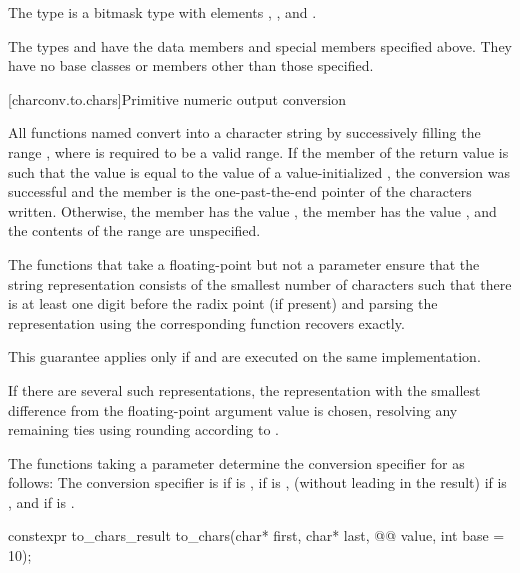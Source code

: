 \pnum
The type  is a bitmask type
with elements , , and .

\pnum
The types  and 
have the data members and special members specified above.
They have no base classes or members other than those specified.

[charconv.to.chars]{Primitive numeric output conversion}

\pnum
All functions named 
convert  into a character string
by successively filling the range
,
where  is required to be a valid range.
If the member 
of the return value
is such that the value
is equal to the value of a value-initialized ,
the conversion was successful
and the member 
is the one-past-the-end pointer of the characters written.
Otherwise,
the member  has the value ,
the member  has the value ,
and the contents of the range  are unspecified.

\pnum
The functions that take a floating-point 
but not a  parameter
ensure that the string representation
consists of the smallest number of characters
such that
there is at least one digit before the radix point (if present) and
parsing the representation using the corresponding  function
recovers  exactly.
\begin{note}
This guarantee applies only if
 and 
are executed on the same implementation.
\end{note}
If there are several such representations,
the representation with the smallest difference from
the floating-point argument value is chosen,
resolving any remaining ties using rounding according to
.

\pnum
The functions taking a  parameter
determine the conversion specifier for  as follows:
The conversion specifier is
 if  is ,
 if  is ,
 (without leading  in the result)
if  is ,
and
 if  is .

%
\begin{itemdecl}
constexpr to_chars_result to_chars(char* first, char* last, @@ value, int base = 10);
\end{itemdecl}

